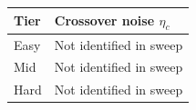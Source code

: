 \begin{tabular}{ll}
\hline
Tier & Crossover noise $\eta_c$ \\
\hline
Easy & Not identified in sweep \\
Mid & Not identified in sweep \\
Hard & Not identified in sweep \\
\hline
\end{tabular}
